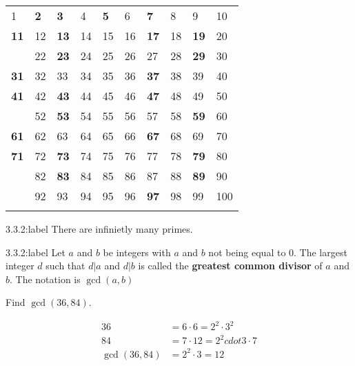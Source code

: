 \begin{longtable}[]{@{}llllllllll@{}}
    \toprule
    1 & \textbf{2} & \textbf{3} & 4 & \textbf{5} & 6 & \textbf{7} & 8 & 9 &
    10 \\ \addlinespace
    \textbf{11} & 12 & \textbf{13} & 14 & 15 & 16 & \textbf{17} & 18 &
    \textbf{19} & 20 \\ \addlinespace
    21 & 22 & \textbf{23} & 24 & 25 & 26 & 27 & 28 & \textbf{29} &
    30 \\ \addlinespace
    \textbf{31} & 32 & 33 & 34 & 35 & 36 & \textbf{37} & 38 & 39 &
    40 \\ \addlinespace
    \textbf{41} & 42 & \textbf{43} & 44 & 45 & 46 & \textbf{47} & 48 & 49 &
    50 \\ \addlinespace
    51 & 52 & \textbf{53} & 54 & 55 & 56 & 57 & 58 & \textbf{59} &
    60 \\ \addlinespace
    \textbf{61} & 62 & 63 & 64 & 65 & 66 & \textbf{67} & 68 & 69 &
    70 \\ \addlinespace
    \textbf{71} & 72 & \textbf{73} & 74 & 75 & 76 & 77 & 78 & \textbf{79} &
    80 \\ \addlinespace
    81 & 82 & \textbf{83} & 84 & 85 & 86 & 87 & 88 & \textbf{89} &
    90 \\ \addlinespace
    91 & 92 & 93 & 94 & 95 & 96 & \textbf{97} & 98 & 99 &
    100 \\ \addlinespace
    \bottomrule
    \end{longtable}


\begin{theorem}{3.3.2:label}
    There are infinietly many primes.
\end{theorem}

\begin{definition}{3.3.2:label}
    Let $a$ and $b$ be integers with $a$ and $b$ not being equal to 0. The largest integer $d$ such that $d|a$ and $d|b$ is called the \textbf{greatest common divisor} of $a$ and $b$. The notation is $\gcd(a,b)$
\end{definition}

\begin{problem}
    Find $\gcd(36,84).$

    $$
    \begin{aligned}
        36 &= 6 \cdot 6 = 2^2 \cdot 3^2\\
        84 &= 7 \cdot 12 = 2^2 cdot 3 \cdot 7\\
        \gcd(36,84) &= 2^2 \cdot 3 = 12
    \end{aligned}
    $$
\end{problem}


